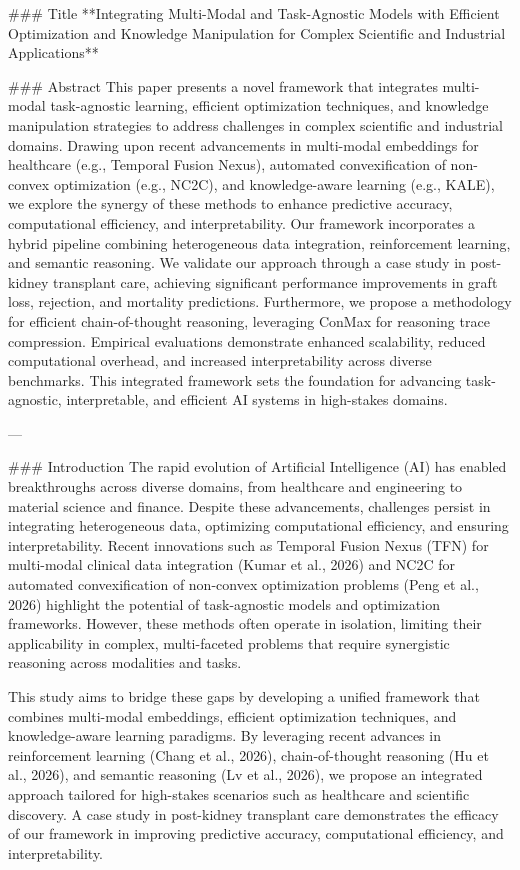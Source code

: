 ### Title
**Integrating Multi-Modal and Task-Agnostic Models with Efficient Optimization and Knowledge Manipulation for Complex Scientific and Industrial Applications**

### Abstract
This paper presents a novel framework that integrates multi-modal task-agnostic learning, efficient optimization techniques, and knowledge manipulation strategies to address challenges in complex scientific and industrial domains. Drawing upon recent advancements in multi-modal embeddings for healthcare (e.g., Temporal Fusion Nexus), automated convexification of non-convex optimization (e.g., NC2C), and knowledge-aware learning (e.g., KALE), we explore the synergy of these methods to enhance predictive accuracy, computational efficiency, and interpretability. Our framework incorporates a hybrid pipeline combining heterogeneous data integration, reinforcement learning, and semantic reasoning. We validate our approach through a case study in post-kidney transplant care, achieving significant performance improvements in graft loss, rejection, and mortality predictions. Furthermore, we propose a methodology for efficient chain-of-thought reasoning, leveraging ConMax for reasoning trace compression. Empirical evaluations demonstrate enhanced scalability, reduced computational overhead, and increased interpretability across diverse benchmarks. This integrated framework sets the foundation for advancing task-agnostic, interpretable, and efficient AI systems in high-stakes domains.

---

### Introduction
The rapid evolution of Artificial Intelligence (AI) has enabled breakthroughs across diverse domains, from healthcare and engineering to material science and finance. Despite these advancements, challenges persist in integrating heterogeneous data, optimizing computational efficiency, and ensuring interpretability. Recent innovations such as Temporal Fusion Nexus (TFN) for multi-modal clinical data integration (Kumar et al., 2026) and NC2C for automated convexification of non-convex optimization problems (Peng et al., 2026) highlight the potential of task-agnostic models and optimization frameworks. However, these methods often operate in isolation, limiting their applicability in complex, multi-faceted problems that require synergistic reasoning across modalities and tasks.

This study aims to bridge these gaps by developing a unified framework that combines multi-modal embeddings, efficient optimization techniques, and knowledge-aware learning paradigms. By leveraging recent advances in reinforcement learning (Chang et al., 2026), chain-of-thought reasoning (Hu et al., 2026), and semantic reasoning (Lv et al., 2026), we propose an integrated approach tailored for high-stakes scenarios such as healthcare and scientific discovery. A case study in post-kidney transplant care demonstrates the efficacy of our framework in improving predictive accuracy, computational efficiency, and interpretability.

